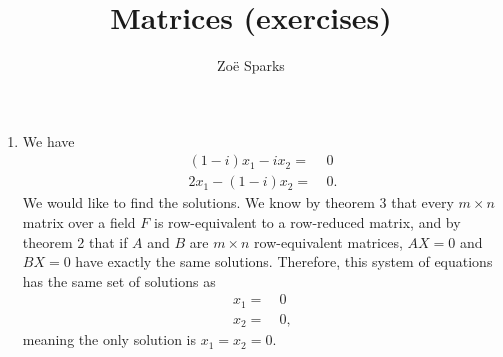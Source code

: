\documentclass[12pt]{article}
\title{Matrices (exercises)}
\author{Zoë Sparks}
\begin{document}
\theoremstyle{definition}

\newtheorem{thm}{Theorem}
\newtheorem*{nthm}{Theorem}
\newtheorem{sthm}{}[thm]
\newtheorem{lemma}{Lemma}[thm]
\newtheorem{cor}{Corollary}[thm]
\newtheorem*{prop}{Property}
\newtheorem*{defn}{Definition}
\newtheorem*{comm}{Comment}
\newtheorem*{exm}{Example}

\maketitle

\begin{enumerate}
    \item
      We have
      \begin{align*}
        (1 - i)x_1 - ix_2 = &\ 0\\
        2x_1 - (1 - i)x_2 = &\ 0.
      \end{align*}
      We would like to find the solutions. We know by theorem 3
      that every $m \times n$ matrix over a field $F$ is
      row-equivalent to a row-reduced matrix, and by theorem 2
      that if $A$ and $B$ are $m \times n$ row-equivalent
      matrices, $AX = 0$ and $BX = 0$ have exactly the same
      solutions.  Therefore, this system of equations has the
      same set of solutions as
      \begin{align*}
        x_1 = &\ 0\\
        x_2 = &\ 0,
      \end{align*}
      meaning the only solution is $x_1 = x_2 = 0$.


\end{enumerate}
\end{document}
